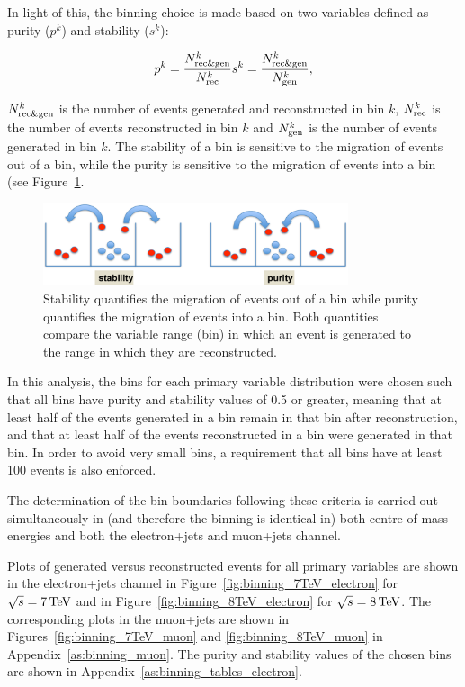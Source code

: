 In light of this, the binning choice is made based on two variables defined as purity ($p^k$) and stability
($s^k$):

\begin{eqnarray}
\label{eq:purity_and_stability}
p^k = \frac{N_{\mathrm{rec}\&\mathrm{gen}}^k}{N_{\mathrm{rec}}^k}
s^k = \frac{N_{\mathrm{rec}\&\mathrm{gen}}^k}{N_{\mathrm{gen}}^k}
,
\end{eqnarray}

$N_{\mathrm{rec}\&\mathrm{gen}}^k$ is the number of events generated and reconstructed in bin $k$,
$N_{\mathrm{rec}}^k$ is the number of events reconstructed in bin $k$ and $N_{\mathrm{gen}}^k$ is the number of events
generated in bin $k$. The stability of a bin is sensitive to the migration of events out of a bin, while
the purity is sensitive to the migration of events into a bin (see Figure~\ref{fig:purity_and_stability}.

\begin{figure}[hbtp]
	\centering
     \includegraphics[width=0.8\textwidth]{Chapters/04_Analysis/04b_XSections/images/purity_and_stability.pdf}
     \caption{Stability quantifies the migration of events out of a bin while purity quantifies the migration
     of events into a bin. Both quantities compare the variable range (bin) in which an event is generated to
     the range in which they are reconstructed.}
     \label{fig:purity_and_stability}
 \end{figure}

In this analysis, the bins for each primary variable distribution were chosen such that all bins have purity
and stability values of 0.5 or greater, meaning that at least half of the events generated in a bin remain in that bin
after reconstruction, and that at least half of the events reconstructed in a bin were generated in that bin.
In order to avoid very small bins, a requirement that all bins have at least 100 events is also enforced.

The determination of the bin boundaries following these criteria is carried out simultaneously in (and
therefore the binning is identical in) both centre of mass energies and both the electron+jets and
muon+jets channel.

Plots of generated versus reconstructed events for all primary variables are shown in the electron+jets
channel in Figure~\ref{fig:binning_7TeV_electron} for $\sqrt{s}=7\,\text{Te\hspace{-.08em}V}$ and in
Figure~\ref{fig:binning_8TeV_electron} for $\sqrt{s}=8\,\text{Te\hspace{-.08em}V}$. The corresponding plots in the muon+jets are
shown in Figures~\ref{fig:binning_7TeV_muon} and \ref{fig:binning_8TeV_muon} in
Appendix~\ref{as:binning_muon}. The purity and stability values of the chosen bins are shown in
Appendix~\ref{as:binning_tables_electron}.


